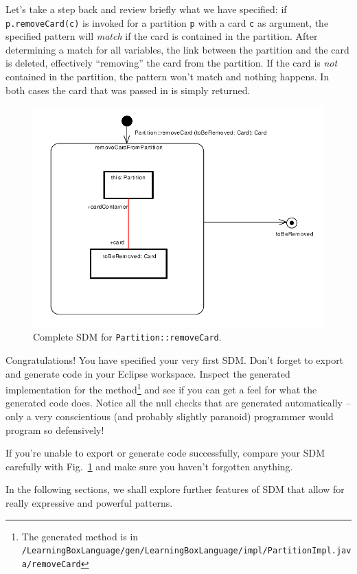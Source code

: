 Let's take a step back and review briefly what we have specified:  if \texttt{p.remove\-Card(c)} is invoked for a partition \texttt{p} with a card \texttt{c} as argument, the specified pattern will \emph{match} if the card is contained in the partition.
After determining a match for all variables, the link between the partition and the card is deleted, effectively ``removing'' the card from the partition.  
If the card is \emph{not} contained in the partition, the pattern won't match and nothing happens. 
In both cases the card that was passed in is simply returned.

\begin{figure}[htbp]
\begin{center}
  \includegraphics[width=\textwidth]{pics/sdmBilder/removeCard/sdm15}
  \caption{Complete SDM for \texttt{Partition::removeCard}.}  
  \label{fig:sdm_complete_control_flow}
\end{center}
\end{figure}

Congratulations!  You have specified your very first SDM.  
Don't forget to export and generate code in your Eclipse workspace. 
Inspect the generated implementation for the method\footnote{The generated method is in \texttt{/Learning\-Box\-Language/\-gen/\-Learning\-Box\-Language/\-impl/\-Partition\-Impl.java/\-remove\-Card}} and see if you can get a feel for what the generated code does. 
Notice all the null checks that are generated automatically -- only a very conscientious (and probably slightly paranoid) programmer would program so defensively!

If you're unable to export or generate code successfully, compare your SDM carefully with Fig.~\ref{fig:sdm_complete_control_flow} and make sure you haven't forgotten anything.

In the following sections, we shall explore further features of SDM that allow for really expressive and powerful patterns.
